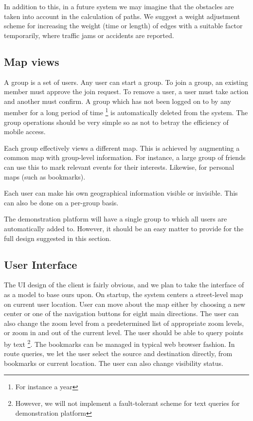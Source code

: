 \documentclass[a4paper,10pt]{article}
\begin{document}
In addition to this, in a future system we may imagine that the obstacles
are taken into account in the calculation of paths. We suggest a weight
adjustment scheme for increasing the weight (time or length) of edges with a
suitable factor temporarily, where traffic jams or accidents are reported.

\subsection{Map views}

A group is a set of users. Any user can start a group. To join a group, an
existing member must approve the join request. To remove a user, a user must
take action and another must confirm. A group which has not been logged on
to by any member for a long period of time \footnote{For instance a year} is
automatically deleted from the system. The group operations should be very
simple so as not to betray the efficiency of mobile access.

Each group effectively views a different map. This is achieved by augmenting
a common map with group-level information. For instance, a large group of
friends can use this to mark relevant events for their interests. Likewise,
for personal maps (such as bookmarks).

Each user can make his own geographical information visible or invisible.
This can also be done on a per-group basis.

The demonstration platform will have a single group to which all users are
automatically added to. However, it should be an easy matter to provide for
the full design suggested in this section.

\subsection{User Interface}

The UI design of the client is fairly obvious, and we plan to take the
interface of \cite{yahoo} as a model to base ours upon. On startup, the
system centers a street-level map on current user location. User can move
about the map either by choosing a new center or one of the navigation
buttons for eight main directions. The user can also change the zoom level
from a predetermined list of appropriate zoom levels, or zoom in and out of
the current level. The user should be able to query points by text
\footnote{However, we will not implement a fault-tolerant scheme for text
  queries for demonstration platform}. The bookmarks can be managed in
typical web browser fashion. In route queries, we let the user select
the source and destination directly, from bookmarks or current location.
The user can also change visibility status.
\end{document}
